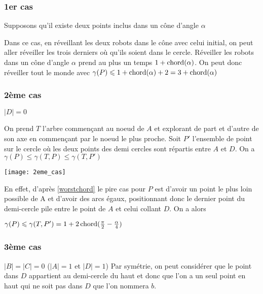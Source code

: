 \subsubsection*{1er cas}\label{1cas} Supposons qu'il existe deux points inclus dans un cône d'angle $\alpha$

Dans ce cas, en réveillant les deux robots dans le cône avec celui initial, on peut aller réveiller les trois derniers où qu'ils soient dans le cercle. Réveiller les robots dans un cône d'angle $\alpha$ prend au plus un temps $1 + \operatorname{chord}(\alpha)$.
On peut donc réveiller tout le monde avec $\gamma(P) \leqslant 1 + \operatorname{chord}(\alpha) + 2 = 3 + \operatorname{chord}(\alpha)$

\subsubsection*{2ème cas}\label{2cas} $|D| = 0$

On prend $T$ l'arbre commençant au noeud de $A$ et explorant de part et d'autre de son axe en commençant par le noeud le plus proche.
Soit $P'$ l'ensemble de point sur le cercle où les deux points des demi cercles sont répartis entre $A$ et $D$.
On a $\gamma(P) \leq  \gamma(T, P) \leq \gamma(T, P')$

  \texttt{[image: 2eme\_cas]}

En effet, d'après \ref{worstchord} le pire cas pour $P$ est d'avoir un point le plus loin possible de A et d'avoir des arcs égaux, positionnant donc le dernier point du demi-cercle pile entre le point de $A$ et celui collant $D$. On a alors

$\gamma(P) \leqslant \gamma(T, P') = 1 + 2\operatorname{chord}(\frac{\pi}{2} - \frac{\alpha}{4})$

\subsubsection*{3ème cas}\label{3cas} $|B| = |C| = 0$ ($|A| = 1$ et $|D| = 1$)
Par symétrie, on peut considérer que le point dans $D$ appartient au demi-cercle du haut et donc que l'on a un seul point en haut qui ne soit pas dans $D$ que l'on nommera $b$.


